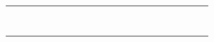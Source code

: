 \documentclass[dvipdfmx,uplatex]{jsarticle}
\begin{document}
\begin{table}[]
\begin{tabular}{|llllllllllllllllll|}
\cline{1-1} \cline{18-18}
\multicolumn{1}{|l|}{} &                       &  &  &  &  &  &  &  &  &                       &                       &                       &                       &                       &                       & \multicolumn{1}{l|}{} &  \\ \cline{2-2} \cline{13-17}
                       & \multicolumn{1}{l|}{} &  &  &  &  &  &  &  &  &                       & \multicolumn{1}{l|}{} &                       &                       &                       &                       &                       &  \\ \cline{13-13}
		                              & \multicolumn{1}{l|}{} &  &  &  &  &  &  &  &  &                       & \multicolumn{1}{l|}{} & \multicolumn{1}{l|}{} &                       &                       &                       &                       &  \\ \cline{3-12} \cline{14-14}
					                             &                       &  &  &  &  &  &  &  &  & \multicolumn{1}{l|}{} &                       &                       & \multicolumn{1}{l|}{} &                       &                       &                       &  \\ \cline{15-15}
								                            &                       &  &  &  &  &  &  &  &  & \multicolumn{1}{l|}{} &                       &                       &                       & \multicolumn{1}{l|}{} &                       &                       &  \\ \cline{16-16}
											                           &                       &  &  &  &  &  &  &  &  & \multicolumn{1}{l|}{} &                       &                       &                       &                       & \multicolumn{1}{l|}{} &                       &  \\
														                          &                       &  &  &  &  &  &  &  &  &                       &                       &                       &                       &                       &                       &                       &  \\ \hline
																	  \end{tabular}
																	  \end{table}
\end{document}
